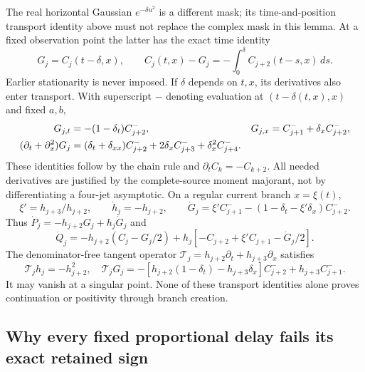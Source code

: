 \documentclass[11pt]{article}
\numberwithin{equation}{section}
\theoremstyle{definition}
\theoremstyle{remark}
\begin{document}
The real horizontal Gaussian $e^{-\delta u^2}$ is a different mask;
its time-and-position transport identity above must not replace the
complex mask in this lemma.  At a fixed observation point the latter
has the exact time identity
\[
 G_j=C_j(t-\delta,x),\qquad
 C_j(t,x)-G_j=-\int_0^\delta C_{j+2}(t-s,x)\,ds.
\]
Earlier stationarity is never imposed.  If $\delta$ depends on $t,x$,
its derivatives also enter transport.  With superscript $-$ denoting
evaluation at $(t-\delta(t,x),x)$ and fixed $a,b$,
\begin{align}
 G_{j,t}&=-(1-\delta_t)C_{j+2}^-,&
 G_{j,x}&=C_{j+1}^-+\delta_x C_{j+2}^-,\notag\\
 (\partial_t+\partial_x^2)G_j
 &=(\delta_t+\delta_{xx})C_{j+2}^-
       +2\delta_xC_{j+3}^-+\delta_x^2C_{j+4}^-.
 \label{eq:general-moving-delay}
\end{align}
These identities follow by the chain rule and $\partial_tC_k=-C_{k+2}$.
All needed derivatives are justified by the complete-source moment
majorant, not by differentiating a four-jet asymptotic.
On a regular current branch $x=\xi(t)$,
\[
 \xi'=h_{j+3}/h_{j+2},\qquad
 \dot h_j=-h_{j+2},\qquad
 \dot G_j=\xi'C_{j+1}^--(1-\delta_t-\xi'\delta_x)C_{j+2}^-.
\]
Thus $\dot P_j=-h_{j+2}G_j+h_j\dot G_j$ and
\[
 \dot Q_j=-h_{j+2}(C_j-G_j/2)
       +h_j[-C_{j+2}+\xi'C_{j+1}-\dot G_j/2].
\]
The denominator-free tangent operator
$\mathcal T_j=h_{j+2}\partial_t+h_{j+3}\partial_x$ satisfies
\[
 \mathcal T_jh_j=-h_{j+2}^2,\quad
 \mathcal T_jG_j=-[h_{j+2}(1-\delta_t)-h_{j+3}\delta_x]C_{j+2}^-
                              +h_{j+3}C_{j+1}^-.
\]
It may vanish at a singular point.  None of these transport identities
alone proves continuation or positivity through branch creation.

\subsection{Why every fixed proportional delay fails its exact retained sign}
\label{subsec:proportional-delay-obstruction}
\end{document}
